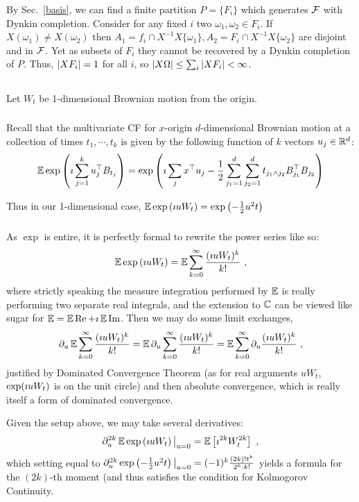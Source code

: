 \documentclass{article}
\begin{document}
     By Sec.~\ref{basis}, we can find a finite partition \(P=\{F_i\}\) which generates \(\mathcal{F}\) with Dynkin completion. Consider for any fixed \(i\) two \(\omega_1,\omega_2\in F_i\). If \(X(\omega_1)\neq X(\omega_2)\) then \(A_1=f_i\cap X^{-1}X\{\omega_1\},A_2=F_i\cap X^{-1}X\{\omega_2\}\) are disjoint and in \(\mathcal{F}\). Yet as subsets of \(F_i\) they cannot be recovered by a Dynkin completion of \(P\). Thus, \(\left\lvert{X F_i}\right\rvert=1\) for all \(i\), so \(\left\lvert{X \Omega}\right\rvert\le\sum_i\left\lvert{XF_i}\right\rvert<\infty\).

     \subsection{}
     Let \(W_t\) be 1-dimensional Brownian motion from the origin.
     \subsubsection{}
     Recall that the multivariate CF for \(x\)-origin \(d\)-dimensional Brownian motion at a collection of times \(t_1,\cdots,t_k\) is given by the following function of \(k\) vectors \(u_j\in\mathbb{R}^d\):
     \[
       \operatorname{\mathbb{E}}\exp\left({\imath\sum_{j=1}^ku_j^\top B_{t_j}}\right)=\exp\left({\imath\sum_j x^\top u_j-\frac{1}{2}\sum_{j_1=1}^d\sum_{j_2=1}^d t_{j_1\land j_2}B_{j_1}^\top B_{j_2}}\right)
     \]

     Thus in our 1-dimensional case, \(\operatorname{\mathbb{E}}\exp\left({\imath u W_t}\right)=\exp\left({-\frac{1}{2}u^2t}\right)\)
     \subsubsection{}

     As \(\exp\) is entire, it is perfectly formal to rewrite the power series like so:
     \[
\operatorname{\mathbb{E}}\exp\left({\imath u W_t}\right)=\operatorname{\mathbb{E}}\sum_{k=0}^\infty\frac{(\imath u W_t)^k}{k!}\,\,,
       \]
     where strictly speaking the measure integration performed by \(\operatorname{\mathbb{E}}\) is really performing two separate real integrals, and the extension to \(\mathbb{C}\) can be viewed like sugar for \(\operatorname{\mathbb{E}}=\operatorname{\mathbb{E}} \operatorname{Re} + \imath\operatorname{\mathbb{E}}\operatorname{Im}\). Then we may do some limit exchanges,
     \[
       \partial_u\operatorname{\mathbb{E}}\sum_{k=0}^\infty\frac{(\imath u W_t)^k}{k!}
       =\operatorname{\mathbb{E}}\partial_u\sum_{k=0}^\infty\frac{(\imath u W_t)^k}{k!}
       =\operatorname{\mathbb{E}}\sum_{k=0}^\infty\partial_u\frac{(\imath u W_t)^k}{k!}
       \,\,,
       \]
       justified by Dominated Convergence Theorem (as for real arguments \(u W_t\), \(\exp(\imath u W_t)\) is on the unit circle) and then absolute convergence, which is really itself a form of dominated convergence.

       Given the setup above, we may take several derivatives:
       \[
         \partial_u^{2k}\operatorname{\mathbb{E}}\exp\left({\imath u W_t}\right)\big|_{u=0}=\operatorname{\mathbb{E}}\left[{\imath^{2k}W_t^{2k}}\right]\,\,,
       \]
       which setting equal to \(\partial_u^{2k}\exp\left({-\frac{1}{2}u^2t}\right)\big|_{u=0}=(-1)^k\frac{(2k)!t^k}{2^k\cdot k!}\) yields a formula for the \((2k)\)-th moment (and thus satisfies the condition for Kolmogorov Continuity.
\end{document}
